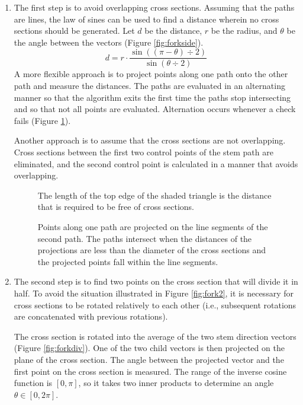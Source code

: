 \documentclass[10pt]{article}
\begin{document}
\begin{enumerate}
\item The first step is to avoid overlapping cross sections. Assuming that the paths are lines, the law of sines can be used to find a distance wherein no cross sections should be generated. Let $ d $ be the distance, $ r $ be the radius, and $ \theta $ be the angle between the vectors (Figure \ref{fig:forkside}).
\[ d = r \cdot \frac{\sin((\pi-\theta)\div2)}{\sin (\theta\div2)} \]
A more flexible approach is to project points along one path onto the other path and measure the distances. The paths are evaluated in an alternating manner so that the algorithm exits the first time the paths stop intersecting and so that not all points are evaluated. Alternation occurs whenever a check fails (Figure \ref{fig:path}).

Another approach is to assume that the cross sections are not overlapping. Cross sections between the first two control points of the stem path are eliminated, and the second control point is calculated in a manner that avoids overlapping.

\begin{figure}[H]
 \begin{minipage}[H]{0.46\textwidth}
  \centering
  
  \caption{The length of the top edge of the shaded triangle is the distance that is required to be free of cross sections.} \label{fig:forkside}
 \end{minipage}
 \hfill
 \begin{minipage}[H]{0.46\textwidth}
  \centering
  
  \caption{Points along one path are projected on the line segments of the second path. The paths intersect when the distances of the projections are less than the diameter of the cross sections and the projected points fall within the line segments.} \label{fig:path}
 \end{minipage}
\end{figure}

\item The second step is to find two points on the cross section that will divide it in half. To avoid the situation illustrated in Figure \ref{fig:fork2}, it is necessary for cross sections to be rotated relatively to each other (i.e., subsequent rotations are concatenated with previous rotations).

The cross section is rotated into the average of the two stem direction vectors (Figure \ref{fig:forkdiv}). One of the two child vectors is then projected on the plane of the cross section. The angle between the projected vector and the first point on the cross section is measured. The range of the inverse cosine function is $ [0, \pi] $, so it takes two inner products to determine an angle $ \theta \in [0, 2\pi] $.


\end{enumerate}
\end{document}
